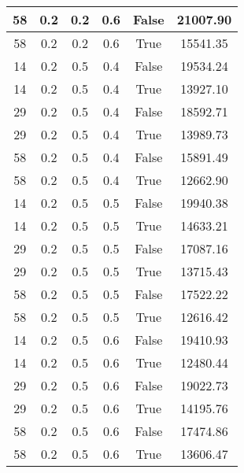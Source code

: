 \documentclass[12pt]{article}
\begin{document}
\begin{table}[h!]
\begin{tabular}{|c|c|c|c|c|c|}
58  &  0.2  &  0.2  &  0.6  &  False  &  21007.90\\ \hline
58  &  0.2  &  0.2  &  0.6  &  True  &  15541.35\\ \hline
14  &  0.2  &  0.5  &  0.4  &  False  &  19534.24\\ \hline
14  &  0.2  &  0.5  &  0.4  &  True  &  13927.10\\ \hline
29  &  0.2  &  0.5  &  0.4  &  False  &  18592.71\\ \hline
29  &  0.2  &  0.5  &  0.4  &  True  &  13989.73\\ \hline
58  &  0.2  &  0.5  &  0.4  &  False  &  15891.49\\ \hline
58  &  0.2  &  0.5  &  0.4  &  True  &  12662.90\\ \hline
14  &  0.2  &  0.5  &  0.5  &  False  &  19940.38\\ \hline
14  &  0.2  &  0.5  &  0.5  &  True  &  14633.21\\ \hline
29  &  0.2  &  0.5  &  0.5  &  False  &  17087.16\\ \hline
29  &  0.2  &  0.5  &  0.5  &  True  &  13715.43\\ \hline
58  &  0.2  &  0.5  &  0.5  &  False  &  17522.22\\ \hline
58  &  0.2  &  0.5  &  0.5  &  True  &  12616.42\\ \hline
14  &  0.2  &  0.5  &  0.6  &  False  &  19410.93\\ \hline
14  &  0.2  &  0.5  &  0.6  &  True  &  12480.44\\ \hline
29  &  0.2  &  0.5  &  0.6  &  False  &  19022.73\\ \hline
29  &  0.2  &  0.5  &  0.6  &  True  &  14195.76\\ \hline
58  &  0.2  &  0.5  &  0.6  &  False  &  17474.86\\ \hline
58  &  0.2  &  0.5  &  0.6  &  True  &  13606.47\\ \hline
\end{tabular}
\end{table}
\end{document}
